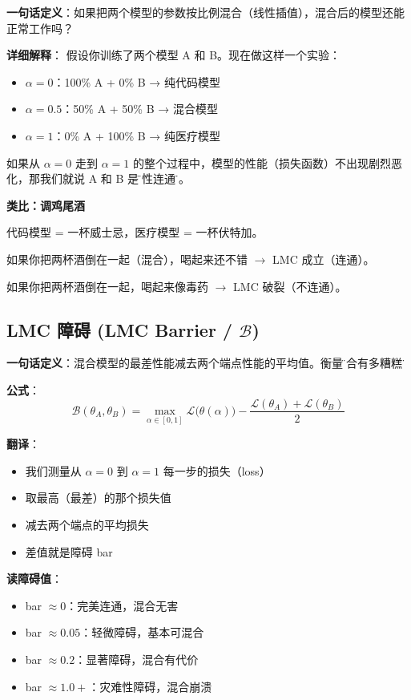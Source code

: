 \documentclass[12pt,a4paper]{article}
\begin{document}
\begin{conceptbox}
\textbf{一句话定义}：如果把两个模型的参数按比例混合（线性插值），混合后的模型还能正常工作吗？

\textbf{详细解释}：
假设你训练了两个模型 A 和 B。现在做这样一个实验：
\begin{itemize}
    \item $\alpha = 0$：100\% A + 0\% B → 纯代码模型
    \item $\alpha = 0.5$：50\% A + 50\% B → 混合模型
    \item $\alpha = 1$：0\% A + 100\% B → 纯医疗模型
\end{itemize}

如果从 $\alpha = 0$ 走到 $\alpha = 1$ 的整个过程中，模型的性能（损失函数）不出现剧烈恶化，那我们就说 A 和 B 是\"线性连通\"的。

\begin{tipbox}
\textbf{类比：调鸡尾酒}

代码模型 = 一杯威士忌，医疗模型 = 一杯伏特加。

如果你把两杯酒倒在一起（混合），喝起来还不错 $\rightarrow$ LMC 成立（连通）。

如果你把两杯酒倒在一起，喝起来像毒药 $\rightarrow$ LMC 破裂（不连通）。
\end{tipbox}
\end{conceptbox}

\subsection{LMC 障碍 (LMC Barrier / $\mathcal{B}$)}

\begin{conceptbox}
\textbf{一句话定义}：混合模型的最差性能减去两个端点性能的平均值。衡量\"混合有多糟糕\"。

\textbf{公式}：
\[
\mathcal{B}(\theta_A, \theta_B) = \max_{\alpha \in [0,1]} \mathcal{L}\big(\theta(\alpha)\big) - \frac{\mathcal{L}(\theta_A) + \mathcal{L}(\theta_B)}{2}
\]

\textbf{翻译}：
\begin{itemize}
    \item 我们测量从 $\alpha=0$ 到 $\alpha=1$ 每一步的损失（loss）
    \item 取最高（最差）的那个损失值
    \item 减去两个端点的平均损失
    \item 差值就是障碍 bar
\end{itemize}

\textbf{读障碍值}：
\begin{itemize}
    \item bar $\approx 0$：完美连通，混合无害
    \item bar $\approx 0.05$：轻微障碍，基本可混合
    \item bar $\approx 0.2$：显著障碍，混合有代价
    \item bar $\approx 1.0+$：灾难性障碍，混合崩溃
\end{itemize}
\end{conceptbox}
\end{document}
